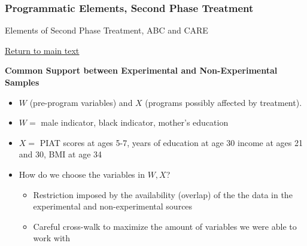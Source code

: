\documentclass[static]{JJH-Beamer}
\begin{document}
\begin{frame}
 \addtocounter{framenumber}{-1}
\frametitle{Programmatic Elements, Second Phase Treatment}
	
\begin{table}[H]
\caption{Elements of Second Phase Treatment, ABC and CARE}
\begin{center}
\end{center}
\end{table}

\end{frame}

\begin{frame}
 \addtocounter{framenumber}{-1}

\begin{center}
\hyperlink{ret:scrambledeggs}{\underline{Return to main text}}
\end{center}

\end{frame}

\clearpage

\begin{frame}
 \addtocounter{framenumber}{-1}

\hypertarget{doughnut}{}
\begin{center}
\textbf{Common Support between Experimental and Non-Experimental Samples}
\end{center}

\end{frame}

\begin{frame}
 \addtocounter{framenumber}{-1}

\begin{itemize}
\item $W$ (pre-program variables) and $X$ (programs possibly affected by treatment).
\item $W =$ {male indicator, black indicator, mother’s education}
\item $X =$ {PIAT scores at ages 5-7, years of education at age 30 income at ages 21 and 30, BMI at age 34}
\item How do we choose the variables in $W,X$?
    \begin{itemize}
    \item Restriction imposed by the availability (overlap) of the the data in the experimental and non-experimental sources
    \item Careful cross-walk to maximize the amount of variables we were able to work with
    \end{itemize}
\end{itemize}

\end{frame}
\end{document}
